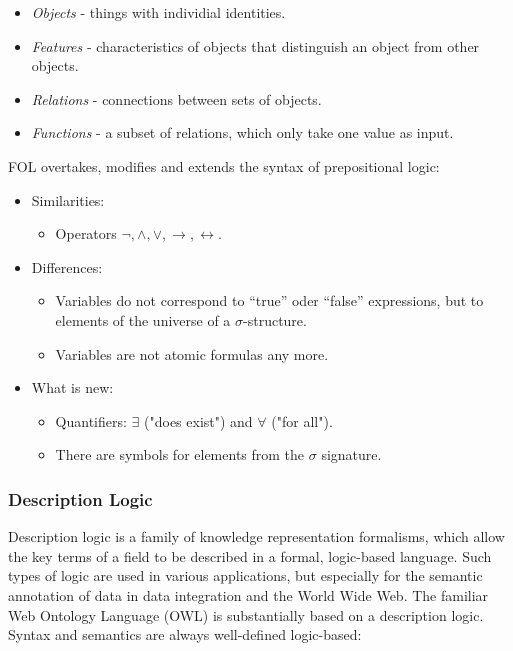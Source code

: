\begin{itemize}
    \item \textit{Objects} - things with individial identities.
    \item \textit{Features} - characteristics of objects that distinguish an object from other objects.
    \item \textit{Relations} - connections between sets of objects.
    \item \textit{Functions} - a subset of relations, which only take one value as input.
\end{itemize}

FOL overtakes, modifies and extends the syntax of prepositional logic:
\begin{itemize}
    \item Similarities:
    \begin{itemize}
        \item Operators $\neg, \wedge, \vee, \rightarrow, \leftrightarrow$.
    \end{itemize}
    \item Differences:
    \begin{itemize}
        \item Variables do not correspond to “true” oder “false” expressions, but to elements of the universe of a  $\sigma$-structure.
        \item Variables are not atomic formulas any more.
    \end{itemize}
    \item What is new:
    \begin{itemize}
        \item Quantifiers: $\exists$ ("does exist") and $\forall$ ("for all").
        \item There are symbols for elements from the $\sigma$ signature.
    \end{itemize}
\end{itemize}
\subsubsection{Description Logic}
Description logic is a family of knowledge representation formalisms, which allow the key terms of a field to be described in a formal, logic-based language. Such types of logic are used in various applications, but especially for the semantic annotation of data in data integration and the World Wide Web. The familiar Web Ontology Language (OWL) is substantially based on a description logic. Syntax and semantics are always well-defined logic-based:

